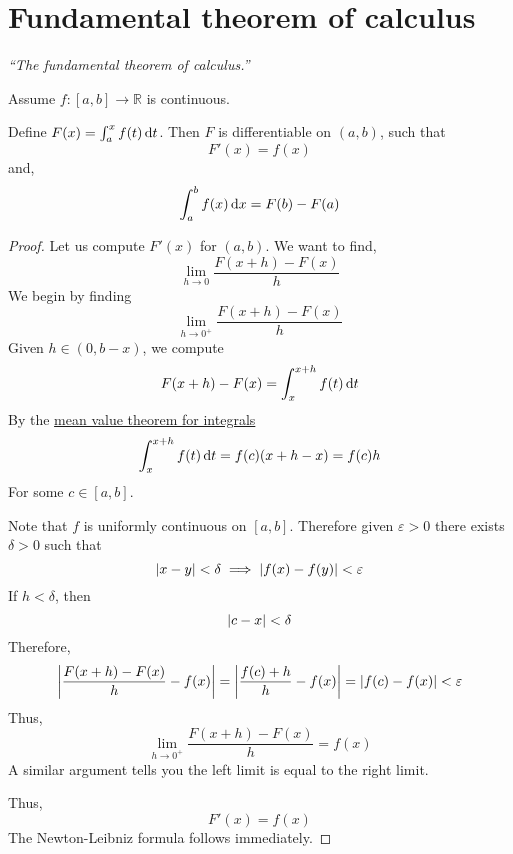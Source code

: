 \documentclass[12pt]{report}
\begin{document}
    \section{Fundamental theorem of calculus}
    \label{Fundamental theorem of calculus}
    \textit{``The fundamental theorem of calculus.''} \vspace{3mm}
    \begin{theorem}
        Assume \(f:[a,b] \to \mathbb{R}\) is continuous. 

        Define \(F(x) = \int^x_a f(t) \, \mathrm{d} t\). Then \(F\) is differentiable on \((a,b)\), such that
        \[F'(x) = f(x)\]
        and,
        \[\int^b_a f(x) \, \mathrm{d} x = F(b) - F(a)\]
    \end{theorem}
    \begin{proof}
        Let us compute \(F'(x)\) for \((a,b)\). We want to find,
        \[\lim_{h \to 0} \frac{F(x+h) - F(x)}{h}\]
        We begin by finding 
        \[\lim_{h \to 0^+} \frac{F(x+h) - F(x)}{h}\]
        Given \(h \in (0, b- x)\), we compute 
        \[F(x+h) - F(x) = \int^{x+h}_x f(t) \, \mathrm{d} t\]
        By the \hyperref[Mean value theorem for integrals]{mean value theorem for integrals}
        \[\int^{x+h}_x f(t) \, \mathrm{d} t = f(c)(x+h-x) = f(c)h\]
        For some \(c \in [a,b]\).
        
        Note that \(f\) is uniformly continuous on \([a,b]\). Therefore given \(\varepsilon >0\) there exists \(\delta >0\) such that
        \[\left| x-y \right|< \delta \implies \left| f(x) - f(y) \right|< \varepsilon\]
        If \(h < \delta\), then
        \[\left| c - x \right| < \delta\]
        Therefore,
        \[\left| \frac{F(x+h) -F(x)}{h} - f(x) \right| = \left| \frac{f(c)+h}{h} - f(x) \right| = \left| f(c) - f(x) \right| < \varepsilon\]
        Thus,
        \[\lim_{h \to 0^+} \frac{F(x+h) - F(x)}{h} = f(x)\]
        A similar argument tells you the left limit is equal to the right limit.

        Thus,
        \[F'(x) = f(x)\]
        The Newton-Leibniz formula follows immediately.
    \end{proof}
\end{document}
